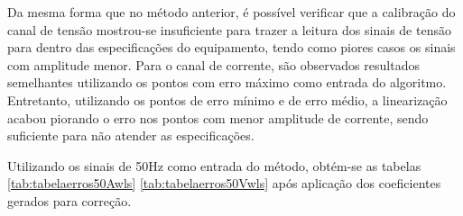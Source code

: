 \begin{table}[htb]
\end{table}

Da mesma forma que no método anterior, é possível verificar que a calibração do canal de tensão mostrou-se insuficiente para trazer a leitura dos sinais de tensão para dentro das especificações do equipamento, tendo como piores casos os sinais com amplitude menor. Para o canal de corrente, são observados resultados semelhantes utilizando os pontos com erro máximo como entrada do algoritmo. Entretanto, utilizando os pontos de erro mínimo e de erro médio, a linearização acabou piorando o erro nos pontos com menor amplitude de corrente, sendo suficiente para não atender as especificações.

Utilizando os sinais de 50Hz como entrada do método, obtém-se as tabelas \ref{tab:tabelaerros50Awls} \ref{tab:tabelaerros50Vwls} após aplicação dos coeficientes gerados para correção.

